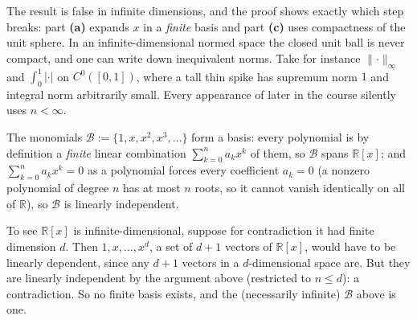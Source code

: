 \begin{exercisesolution}
\begin{remark}
\label{rem:norm_equivalence_needs_finite_dimension}
The result is false in infinite dimensions, and the proof shows exactly which step breaks: part
\textbf{(a)} expands $x$ in a \emph{finite} basis and part \textbf{(c)} uses compactness of the
unit sphere. In an
infinite-di\-men\-sional normed space the closed unit ball is never compact, and one can write
down inequivalent norms. Take for instance $\lVert\cdot\rVert_\infty$ and
$\int_0^1|\cdot|$ on $C^0([0,1])$, where a tall thin spike has supremum norm $1$ and integral
norm arbitrarily small. Every appearance of  later
in the course silently uses $n < \infty$.
\end{remark}
\end{exercisesolution}

\begin{exercisesolution}
\label{sol:polynomials_infinite_dimensional}
The monomials $\mathcal{B} := \{1,x,x^2,x^3,\dots\}$ form a basis: every polynomial is by
definition a \emph{finite} linear combination $\sum_{k=0}^n a_kx^k$ of them, so $\mathcal{B}$
spans $\mathbb{R}[x]$; and $\sum_{k=0}^n a_kx^k = 0$ as a polynomial forces every coefficient
$a_k = 0$ (a nonzero polynomial of degree $n$ has at most $n$ roots, so it cannot vanish
identically on all of $\mathbb{R}$), so $\mathcal{B}$ is linearly independent.

To see $\mathbb{R}[x]$ is infinite-dimensional, suppose for contradiction it had finite
dimension $d$. Then $1,x,\dots,x^d$, a set of $d+1$ vectors of $\mathbb{R}[x]$, would have
to be linearly dependent, since any $d+1$ vectors in a $d$-dimensional space are. But they are
linearly independent by the argument above (restricted to $n \leq d$): a contradiction. So no
finite basis exists, and the (necessarily infinite) $\mathcal{B}$ above is one.
\end{exercisesolution}

